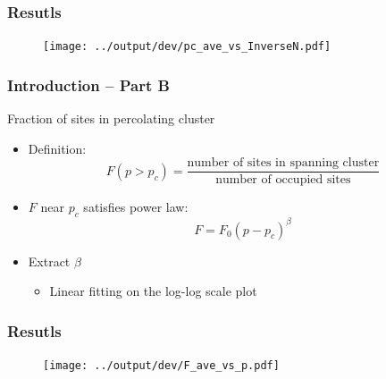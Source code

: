 \documentclass[mathserif,18pt,xcolor=table]{beamer}
\begin{document}
\begin{frame}
	\frametitle{Resutls}
	\begin{figure}
  	\centering
  	\texttt{[image: ../output/dev/pc\_ave\_vs\_InverseN.pdf]}
	\end{figure}
\end{frame}


\begin{frame}
	\frametitle{Introduction -- Part B}
	Fraction of sites in percolating cluster
	\begin{itemize}
		\item Definition:
			\begin{equation}
			F(p>p_c)=\frac{\text{number of sites in spanning cluster}}{\text{number of occupied sites}}
			\end{equation}
		\item $F$ near $p_c$ satisfies power law:
			\begin{equation}
			F=F_0(p-p_c)^\beta
			\end{equation}
		\item Extract $\beta$
			\begin{itemize}
				\item Linear fitting on the log-log scale plot
			\end{itemize}
	\end{itemize}
\end{frame}


\begin{frame}
	\frametitle{Resutls}
	\begin{figure}
  	\centering
  	\texttt{[image: ../output/dev/F\_ave\_vs\_p.pdf]}
	\end{figure}
\end{frame}
\end{document}
